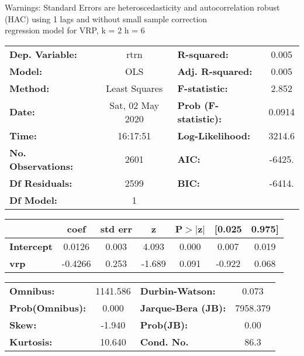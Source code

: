 Warnings: \newline
 [1] Standard Errors are heteroscedasticity and autocorrelation robust (HAC) using 1 lags and without small sample correction\\ 

regression model for VRP, k = 2 h = 6\begin{center}
\begin{tabular}{lclc}
\toprule
\textbf{Dep. Variable:}    &       rtrn       & \textbf{  R-squared:         } &     0.005   \\
\textbf{Model:}            &       OLS        & \textbf{  Adj. R-squared:    } &     0.005   \\
\textbf{Method:}           &  Least Squares   & \textbf{  F-statistic:       } &     2.852   \\
\textbf{Date:}             & Sat, 02 May 2020 & \textbf{  Prob (F-statistic):} &   0.0914    \\
\textbf{Time:}             &     16:17:51     & \textbf{  Log-Likelihood:    } &    3214.6   \\
\textbf{No. Observations:} &        2601      & \textbf{  AIC:               } &    -6425.   \\
\textbf{Df Residuals:}     &        2599      & \textbf{  BIC:               } &    -6414.   \\
\textbf{Df Model:}         &           1      & \textbf{                     } &             \\
\bottomrule
\end{tabular}
\begin{tabular}{lcccccc}
                   & \textbf{coef} & \textbf{std err} & \textbf{z} & \textbf{P$> |$z$|$} & \textbf{[0.025} & \textbf{0.975]}  \\
\midrule
\textbf{Intercept} &       0.0126  &        0.003     &     4.093  &         0.000        &        0.007    &        0.019     \\
\textbf{vrp}       &      -0.4266  &        0.253     &    -1.689  &         0.091        &       -0.922    &        0.068     \\
\bottomrule
\end{tabular}
\begin{tabular}{lclc}
\textbf{Omnibus:}       & 1141.586 & \textbf{  Durbin-Watson:     } &    0.073  \\
\textbf{Prob(Omnibus):} &   0.000  & \textbf{  Jarque-Bera (JB):  } & 7958.379  \\
\textbf{Skew:}          &  -1.940  & \textbf{  Prob(JB):          } &     0.00  \\
\textbf{Kurtosis:}      &  10.640  & \textbf{  Cond. No.          } &     86.3  \\
\bottomrule
\end{tabular}
\end{center}


